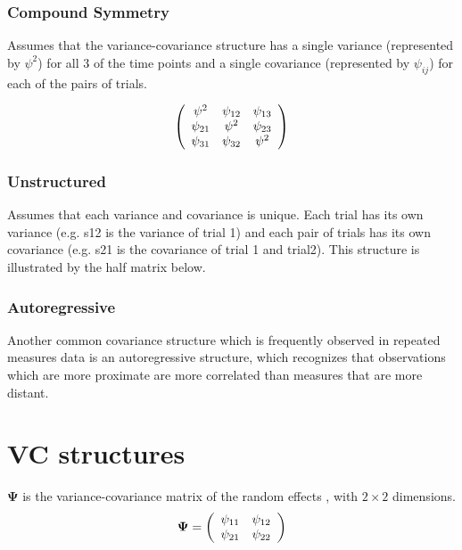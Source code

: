 \documentclass[12pt, a4paper]{report}
\theoremstyle{plain}
\theoremstyle{definition}
\theoremstyle{remark}
\begin{document}
\subsubsection{Compound Symmetry}

Assumes that the variance-covariance structure has a single variance (represented by $\psi^2$)
for all 3 of the time points and a single covariance (represented by $\psi_{ij}$) for each of the pairs of trials.

\[
\left(%
\begin{array}{c c c}
\psi^2 &  \psi_{12} & \psi_{13}   \\
\psi_{21} & \psi^2 & \psi_{23}   \\
\psi_{31} & \psi_{32} & \psi^2   \\
\end{array}%
\right)
\]


\subsubsection{Unstructured}

Assumes that each variance and covariance is unique.
Each trial has its own variance (e.g. s12 is the variance of trial 1)
and each pair of trials has its own covariance (e.g. s21 is the covariance of trial 1 and trial2).
This structure is illustrated by the half matrix below.



\subsubsection{Autoregressive}

Another common covariance structure which is frequently observed
in repeated measures data is an autoregressive structure,
which recognizes that observations which are more proximate
are more correlated than measures that are more distant.







\section{VC structures}
$\boldsymbol{\Psi}$ is the variance-covariance matrix of the random effects ,
with $2 \times 2$ dimensions.
\begin{equation}
\boldsymbol{\Psi} =
\left(%
\begin{array}{c c}
\psi_{11} & \psi_{12}  \\
\psi_{21} & \psi_{22}  \\
\end{array}%
\right)
\end{equation}
\end{document}
